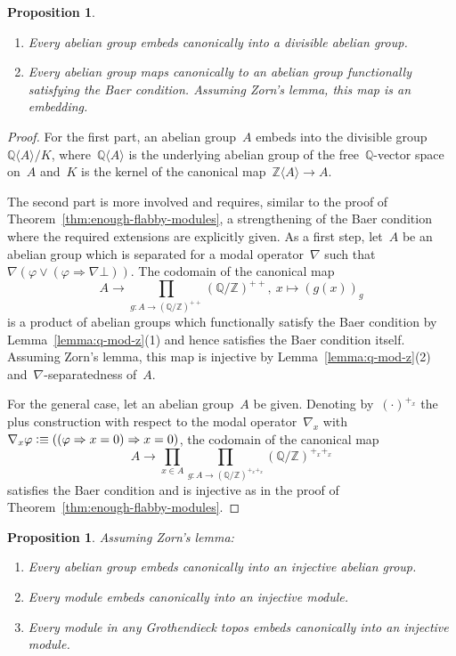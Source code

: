 \documentclass[oneside]{amsart}
\theoremstyle{definition}
\theoremstyle{plain}
\newtheorem{prop}[defn]{Proposition}
\theoremstyle{remark}
\newcommand{\ZZ}{\mathbb{Z}}
\newcommand{\QQ}{\mathbb{Q}}
\newcommand{\defeqv}{\vcentcolon\equiv}
\renewcommand{\_}{\mathpunct{.}\,}
\begin{document}
\begin{prop}\label{prop:embed2}
\begin{enumerate}
\item Every abelian group embeds canonically into a divisible abelian group.
\item Every abelian group maps canonically to an abelian group functionally satisfying the Baer
condition. Assuming Zorn's lemma, this map is an embedding.
\end{enumerate}
\end{prop}

\begin{proof}For the first part, an abelian group~$A$ embeds into the
divisible group~$\QQ\langle A \rangle / K$, where~$\QQ\langle A \rangle$ is the
underlying abelian group of the free~$\QQ$-vector space on~$A$ and~$K$ is the
kernel of the canonical map~$\ZZ\langle A \rangle \to A$.

The second part is more involved and requires, similar to the proof of
Theorem~\ref{thm:enough-flabby-modules}, a strengthening of the Baer condition
where the required extensions are explicitly given. As a first step, let~$A$ be
an abelian group which is separated for a modal operator~$\nabla$ such
that~$\nabla(\varphi \vee (\varphi \Rightarrow \nabla\bot))$. The codomain of
the canonical map
\[ A \longrightarrow \prod_{g : A \to (\QQ/\ZZ)^{++}} (\QQ/\ZZ)^{++},\
  x \longmapsto (g(x))_g \]
is a product of abelian groups which functionally satisfy the Baer condition by
Lemma~\ref{lemma:q-mod-z}(1) and hence satisfies the Baer condition itself.
Assuming Zorn's lemma, this map is injective by Lemma~\ref{lemma:q-mod-z}(2)
and~$\nabla$-separatedness of~$A$.

For the general case, let an abelian group~$A$ be given. Denoting
by~$(\cdot)^{+_x}$ the plus construction with respect to the modal
operator~$\nabla_x$ with~$\nabla_x\varphi \defeqv ((\varphi \Rightarrow x
= 0) \Rightarrow x = 0)$, the codomain of the canonical map
\[ A \longrightarrow \prod_{x \in A} \prod_{g : A \to (\QQ/\ZZ)^{+_x+_x}}
(\QQ/\ZZ)^{+_x+_x} \]
satisfies the Baer condition and is injective as in the proof of
Theorem~\ref{thm:enough-flabby-modules}.
\end{proof}

\begin{prop}Assuming Zorn's lemma:
\begin{enumerate}
\item Every abelian group embeds canonically into an injective abelian group.
\item Every module embeds canonically into an injective module.
\item Every module in any Grothendieck topos embeds canonically into an injective module.
\end{enumerate}
\end{prop}
\end{document}
